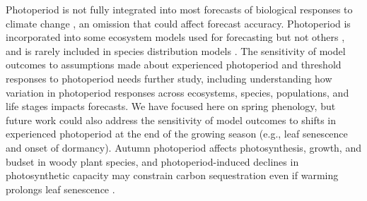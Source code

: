 \documentclass{article}
\begin{document}
\par Photoperiod is not fully integrated into most forecasts of biological responses to climate change \citep[but see][for an example in insects]{tobin2008}, an omission that could affect forecast accuracy. Photoperiod is incorporated into some ecosystem models \citep[e.g., the Ecosystem Demography model] []{jolly2005,medvigy2013} used for forecasting but not others \citep[e.g.,][]{richardson2012}, and is rarely included in species distribution models \citep[e.g.,][]{morin2009,zhu2012}. The sensitivity of model outcomes to assumptions made about experienced photoperiod and threshold responses to photoperiod needs further study, including understanding how variation in photoperiod responses across ecosystems, species, populations, and life stages impacts forecasts. 
We have focused here on spring phenology, but future work could also address the sensitivity of model outcomes to shifts in experienced photoperiod at the end of the growing season (e.g., leaf senescence and onset of dormancy). Autumn photoperiod affects photosynthesis, growth, and budset in woody plant species, and photoperiod-induced declines in photosynthetic capacity may constrain carbon sequestration even if warming prolongs leaf senescence \citep[][]{Howe:1996, bauerle2012,stinziano2017}.
\end{document}
